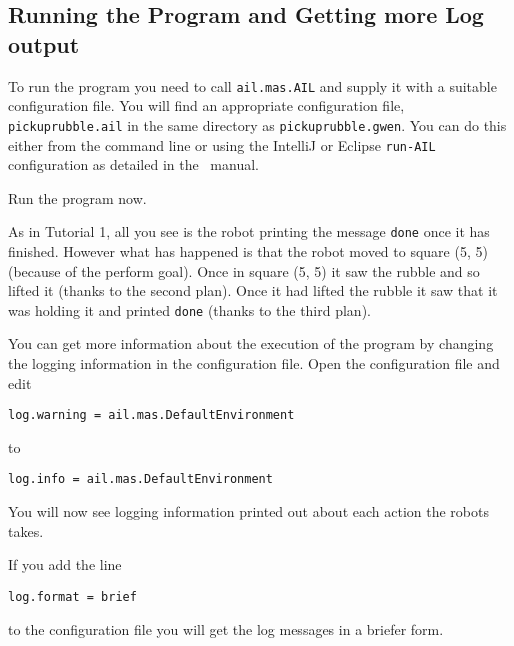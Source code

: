 \subsection{Running the Program and Getting more Log output}

\begin{sloppypar}
To run the program you need to call \texttt{ail.mas.AIL} and supply it with a suitable configuration
file.
You will find an appropriate configuration file,
\texttt{pickuprubble.ail} in the same
directory as \texttt{pickuprubble.gwen}.  You can do this either from
the command line or using the IntelliJ or Eclipse \texttt{run-AIL}
configuration as detailed in the \mcapl\ manual.
\end{sloppypar}

Run the program now.

As in Tutorial 1, all you see is the robot
printing the message
\lstinline{done} once it has finished.  However what has happened is
that the robot moved to square (5, 5) (because of the perform
goal).  Once in square (5, 5) it saw
the rubble and so lifted it (thanks to the second plan).
Once it had lifted the rubble it saw that it was holding it and
printed \lstinline{done} (thanks to the third plan).

You can get more information about the execution of the program by
changing the logging information in the configuration file.  Open the
configuration file and
edit
\begin{verbatim}
log.warning = ail.mas.DefaultEnvironment
\end{verbatim}
to
\begin{verbatim}
log.info = ail.mas.DefaultEnvironment
\end{verbatim}
You will now see logging information printed out about each action the robots takes.

If you add the line
\begin{verbatim}
log.format = brief
\end{verbatim}
to the configuration file you will get the log messages in a briefer form.

